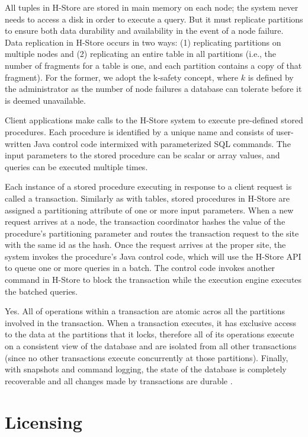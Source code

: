 \documentclass[9pt,twocolumn,twoside]{styles/osajnl}
\begin{document}
All tuples in H-Store are stored in main memory on each node; the system never needs to access a disk in order to execute a query. But it must replicate partitions to ensure both data durability and availability in the event of a node failure. Data replication in H-Store occurs in two ways: (1) replicating partitions on multiple nodes and (2) replicating an entire table in all partitions (i.e., the number of fragments for a table is one, and each partition contains a copy of that fragment). For the former, we adopt the k-safety concept, where $k$ is defined by the administrator as the number of node failures a database can tolerate before it is deemed unavailable.

Client applications make calls to the H-Store system to execute pre-defined stored procedures. Each procedure is identified by a unique name and consists of user-written Java control code intermixed with parameterized SQL commands. The input parameters to the stored procedure can be scalar or array values, and queries can be executed multiple times.

Each instance of a stored procedure executing in response to a client request is called a transaction. Similarly as with tables, stored procedures in H-Store are assigned a partitioning attribute of one or more input parameters. When a new request arrives at a node, the transaction coordinator hashes the value of the procedure’s partitioning parameter and routes the transaction request to the site with the same id as the hash. Once the request arrives at the proper site, the system invokes the procedure’s Java control code, which will use the H-Store API to queue one or more queries in a batch. The control code invokes another command in H-Store to block the transaction while the execution engine executes the batched queries.

Yes. All of operations within a transaction are atomic acros all the partitions involved in the transaction. When a transaction executes, it has exclusive access to the data at the partitions that it locks, therefore all of its operations execute on a consistent view of the database and are isolated from all other transactions (since no other transactions execute concurrently at those partitions). Finally, with snapshots and command logging, the state of the database is completely recoverable and all changes made by transactions are durable \cite{kallman2008} \cite{www-H-StoreArch}.

\section{Licensing}
\end{document}
